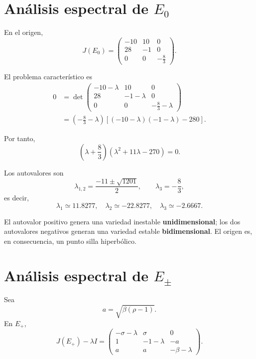 \documentclass[12pt,a4paper,oneside]{report}
\theoremstyle{definition}
\numberwithin{equation}{chapter}
\begin{document}
\section{Análisis espectral de \(E_0\)}
En el origen,
\begin{equation}
    J(E_0)=
    \begin{pmatrix}
        -10&10&0\\
        28&-1&0\\
        0&0&-\frac83
    \end{pmatrix}.
\end{equation}

El problema característico es
\begin{align}
    0&=\det
    \begin{pmatrix}
        -10-\lambda&10&0\\
        28&-1-\lambda&0\\
        0&0&-\frac83-\lambda
    \end{pmatrix}\\
    &= \left(-\frac83-\lambda\right) \left[(-10-\lambda)(-1-\lambda)-280\right].
\end{align}

Por tanto,
\begin{equation}
    \left(\lambda+\frac83\right) \left(\lambda^2+11\lambda-270\right)=0.
\end{equation}

Los autovalores son
\begin{equation}
    \lambda_{1,2}=\frac{-11\pm\sqrt{1201}}{2}, \qquad \lambda_3=-\frac83,
\end{equation}
es decir,
\begin{equation}
    \boxed{ \lambda_1\simeq11.8277,\quad \lambda_2\simeq-22.8277,\quad \lambda_3\simeq-2.6667.}
\end{equation}

El autovalor positivo genera una variedad inestable \textbf{unidimensional}; los dos autovalores negativos generan una variedad estable \textbf{bidimensional}. El origen es, en consecuencia, un punto silla hiperbólico.

\section{Análisis espectral de \(E_{\pm}\)}
Sea
\[
    a=\sqrt{\beta(\rho-1)}.
\]
En \(E_+\),
\begin{equation}
    J(E_+)-\lambda I=
    \begin{pmatrix}
        -\sigma-\lambda&\sigma&0\\
        1&-1-\lambda&-a\\
        a&a&-\beta-\lambda
    \end{pmatrix}.
\end{equation}
\end{document}
